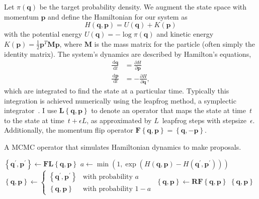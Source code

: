\documentclass{article}
\newcommand{\dd}{\, \mathrm{d}}
\renewcommand{\vec}[1]{\ensuremath{\mathbf{#1}}}
\newcommand{\mat}[1]{\ensuremath{\mathbf{#1}}}
\newcommand{\op}[1]{\ensuremath{\mathbf{#1}}}
\begin{document}
    Let $\pi\left(\vec{q}\right)$ be the target probability density.
    We augment the state space with momentum $\vec{p}$ and define the
        Hamiltonian for our system as
        \begin{equation}
            H\left(\vec{q},\vec{p}\right)
            = U\left(\vec{q}\right) + K\left(\vec{p}\right)
        \end{equation}
        with the potential energy
        $U\left(\vec{q}\right) = -\log{\pi\left(\vec{q}\right)}$ and kinetic
        energy $K\left(\vec{p}\right) = \frac{1}{2} \vec{p}^T \mat{M} \vec{p}$,
        where $\mat{M}$ is the mass matrix for the particle (often simply the
        identity matrix).
    The system's dynamics are described by Hamilton's equations,
        \begin{align}
            \frac{\dd \vec{q}}{\dd t} &= \frac{\partial H}{\partial \vec{p}} \\
            \frac{\dd \vec{p}}{\dd t} &= -\frac{\partial H}{\partial \vec{q}},
        \end{align}
        which are integrated to find the state at a particular time.
    Typically this integration is achieved numerically using the leapfrog
        method, a symplectic integrator~\cite{Nea11}.
    I use $\op{L}\left\{\vec{q},\vec{p}\right\}$ to denote an operator that
        maps the state at time~$t$ to the state at time~$t + \epsilon L$, as
        approximated by $L$~leapfrog steps with stepsize~$\epsilon$.
    Additionally, the momentum flip operator
        $\op{F}\left\{\vec{q},\vec{p}\right\} = \left\{\vec{q},-\vec{p}\right\}$.

    \begin{algorithm}
        \caption{A \ac{MCMC} operator that simulates Hamiltonian dynamics to
                 make proposals.}
        \begin{algorithmic}[1]
        \Function {HamiltonUpdate}{$\left\{\vec{q},\vec{p}\right\}$}
            \State $\left\{\vec{q}^\prime, \vec{p}^\prime\right\}
                \leftarrow \op{F}\op{L}\left\{\vec{q},\vec{p}\right\}$
            \State $a \leftarrow \min\left(1,
                \exp\left(
                    H\left(\vec{q}, \vec{p}\right) - H\left(\vec{q}^\prime,
                        \vec{p}^\prime\right)\right)\right)$
            \State $\left\{\vec{q},\vec{p}\right\} \leftarrow
                \begin{cases}
                    \left\{\vec{q}^\prime, \vec{p}^\prime\right\}
                        & \text{with probability } a \\
                    \left\{\vec{q},\vec{p}\right\}
                        & \text{with probability } 1 - a
                \end{cases}$
            \State $\left\{\vec{q},\vec{p}\right\} \leftarrow
                        \op{R}\op{F}\left\{\vec{q},\vec{p}\right\}$
            \State \Return $\left\{\vec{q},\vec{p}\right\}$
        \EndFunction
        \end{algorithmic}
    \end{algorithm}
\end{document}
